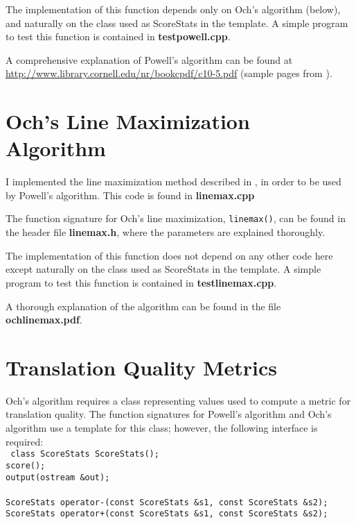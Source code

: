 \documentclass[12pt]{amsart}
\newcommand{\file}{\textbf} \newcommand{\url}{\underline}
\newcommand{\code}[1]{{\small \texttt{#1}}}
\begin{document}
The implementation of this function depends only on Och's algorithm (below),
and naturally on the class used as ScoreStats in the template.  A simple
program to test this function is contained in \file{testpowell.cpp}.

A comprehensive explanation of Powell's algorithm can be found at
\url{http://www.library.cornell.edu/nr/bookcpdf/c10-5.pdf} (sample pages from
\cite{NR-C}).

\section*{Och's Line Maximization Algorithm}

I implemented the line maximization method described in \cite{och-linemin}, in
order to be used by Powell's algorithm.  This code is found in
\file{linemax.cpp}

The function signature for Och's line maximization, \code{linemax()}, can be found in the header file \file{linemax.h}, where the parameters are explained thoroughly.

The implementation of this function does not depend on any other code here
except naturally on the class used as ScoreStats in the template.  A simple
program to test this function is contained in \file{testlinemax.cpp}.

A thorough explanation of the algorithm can be found in the file
\file{ochlinemax.pdf}.

\section*{Translation Quality Metrics}

Och's algorithm requires a class representing values used to compute a metric
for translation quality.  The function signatures for Powell's algorithm and
Och's algorithm use a template for this class; however, the following interface
is required: \\ \code{
  class ScoreStats {\indent ScoreStats(); \\
    \indent score(); \\ \indent output(ostream \&out); \\
  } \\ ScoreStats operator-(const ScoreStats \&s1, const ScoreStats \&s2); \\
  ScoreStats operator+(const ScoreStats \&s1, const ScoreStats \&s2);
}
\end{document}
